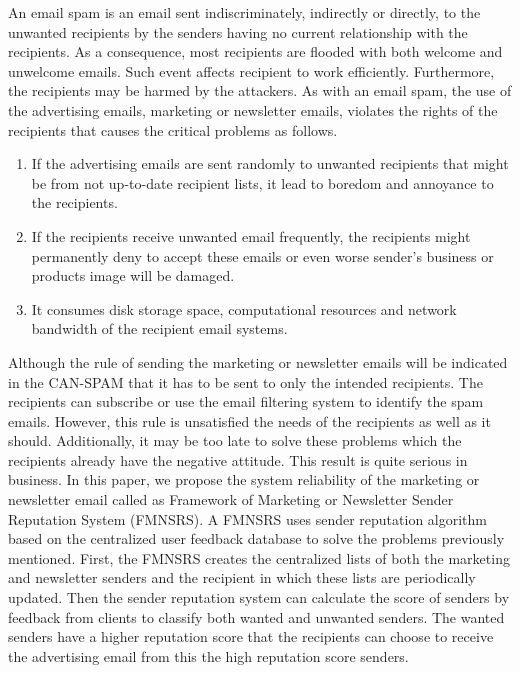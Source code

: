 \documentclass[conference]{IEEEtran}
\begin{document}
An email spam is an email sent indiscriminately, indirectly or directly, to the unwanted recipients by the senders having no current relationship with the recipients.
%
As a consequence, most recipients are flooded with both welcome and unwelcome emails.
%
Such event affects recipient to work efficiently.
% 
Furthermore, the recipients may be harmed by the attackers.
%
As with an email spam, the use of the advertising emails, marketing or newsletter emails, violates the rights of the recipients that causes the critical problems as follows. 
%
\begin{enumerate}
  \item If the advertising emails are sent randomly to unwanted recipients that might be from not up-to-date recipient lists, it lead to boredom and annoyance to the recipients.
  \item If the recipients receive unwanted email frequently, the recipients might permanently deny to accept these emails or even worse sender's business or products image will be damaged.
  \item It consumes disk storage space, computational resources and network bandwidth of the recipient email systems.
\end{enumerate}

Although the rule of sending the marketing or newsletter emails will be indicated in the CAN-SPAM that it has to be sent to only the intended recipients.
%
The recipients can subscribe or use the email filtering system to identify the spam emails. 
%
However, this rule is unsatisfied the needs of the recipients as well as it should.
%
Additionally, it may be too late to solve these problems which the recipients already have the negative attitude. 
%
This result is quite serious in business.
%
In this paper, we propose the system reliability of the marketing or newsletter email called as Framework of Marketing or Newsletter Sender Reputation System (FMNSRS).  
%
A FMNSRS uses sender reputation algorithm based on the centralized user feedback database to solve the problems previously mentioned.
%
First, the FMNSRS creates the centralized lists of both the marketing and newsletter senders and the recipient in which these lists are periodically updated.
%
Then the sender reputation system can calculate the score of senders by feedback from clients to classify both wanted and unwanted senders. 
%
The wanted senders have a higher reputation score that the recipients can choose to receive the advertising email from this the high reputation score senders.
\end{document}
